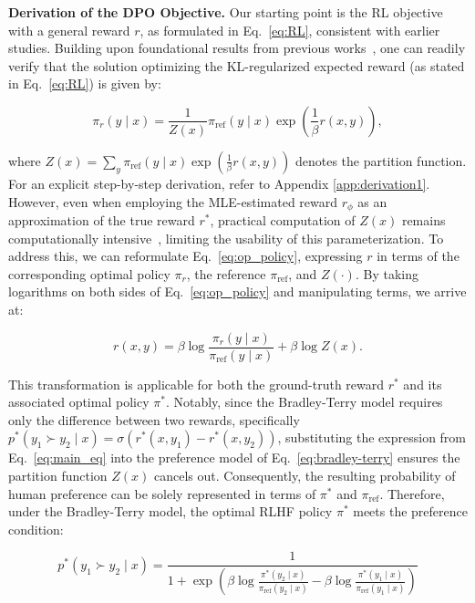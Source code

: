 \textbf{Derivation of the DPO Objective.} Our starting point is the RL objective with a general reward $r$, as formulated in Eq.~\ref{eq:RL}, consistent with earlier studies. Building upon foundational results from previous works~\citep{peters2007reinforcement, peng2019advantage, korbak2022reinforcement, go2023aligning}, one can readily verify that the solution optimizing the KL-regularized expected reward (as stated in Eq.~\ref{eq:RL}) is given by:

\begin{equation}\label{eq:op_policy}
    \pi_r(y\mid x) = \frac{1}{Z(x)}\pi_\text{ref}(y\mid x)\exp\left(\frac{1}{\beta}r(x, y)\right),
\end{equation}

where $Z(x) =\sum_{y}\pi_\text{ref}(y\mid x)\exp\left(\frac{1}{\beta}r(x, y)\right)$ denotes the partition function. For an explicit step-by-step derivation, refer to Appendix \ref{app:derivation1}. However, even when employing the MLE-estimated reward $r_\phi$ as an approximation of the true reward $r^*$, practical computation of $Z(x)$ remains computationally intensive~\citep{korbak2022reinforcement, go2023aligning}, limiting the usability of this parameterization. To address this, we can reformulate Eq.~\ref{eq:op_policy}, expressing $r$ in terms of the corresponding optimal policy $\pi_r$, the reference $\pi_\text{ref}$, and $Z(\cdot)$. By taking logarithms on both sides of Eq.~\ref{eq:op_policy} and manipulating terms, we arrive at:

\begin{equation}\label{eq:main_eq}
    r(x,y) =\beta \log \frac{\pi_r(y\mid x)}{\pi_\text{ref}(y\mid x)} + \beta \log Z(x).
\end{equation}

This transformation is applicable for both the ground-truth reward $r^*$ and its associated optimal policy $\pi^*$. Notably, since the Bradley-Terry model requires only the difference between two rewards, specifically ${p^*(y_1 \succ y_2 \mid x) = \sigma(r^*(x, y_1) - r^*(x, y_2))}$, substituting the expression from Eq.~\ref{eq:main_eq} into the preference model of Eq.~\ref{eq:bradley-terry} ensures the partition function $Z(x)$ cancels out. Consequently, the resulting probability of human preference can be solely represented in terms of $\pi^*$ and $\pi_\text{ref}$. Therefore, under the Bradley-Terry model, the optimal RLHF policy $\pi^*$ meets the preference condition:

\begin{equation}\label{eq:objective}
    p^*(y_1\succ y_2 \mid x)=\frac{1}{1 + \exp\left(\beta \log \frac{\pi^*(y_2\mid x)}{\pi_\text{ref}(y_2\mid x)} - \beta \log \frac{\pi^*(y_1\mid x)}{\pi_\text{ref}(y_1\mid x)}\right)}
\end{equation}

